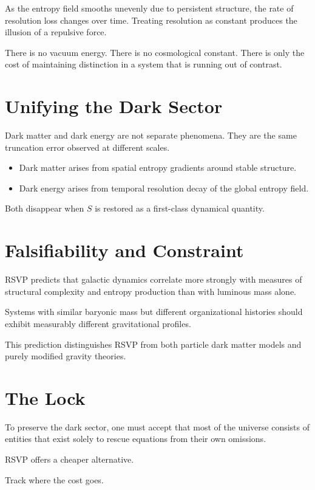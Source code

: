 \documentclass[11pt]{book}
\begin{document}
As the entropy field smooths unevenly due to persistent structure, the rate of resolution loss changes over time. Treating resolution as constant produces the illusion of a repulsive force.

There is no vacuum energy. There is no cosmological constant. There is only the cost of maintaining distinction in a system that is running out of contrast.

\section{Unifying the Dark Sector}

Dark matter and dark energy are not separate phenomena. They are the same truncation error observed at different scales.

\begin{itemize}
\item Dark matter arises from spatial entropy gradients around stable structure.
\item Dark energy arises from temporal resolution decay of the global entropy field.
\end{itemize}

Both disappear when \(S\) is restored as a first-class dynamical quantity.

\section{Falsifiability and Constraint}

RSVP predicts that galactic dynamics correlate more strongly with measures of structural complexity and entropy production than with luminous mass alone.

Systems with similar baryonic mass but different organizational histories should exhibit measurably different gravitational profiles.

This prediction distinguishes RSVP from both particle dark matter models and purely modified gravity theories.

\section{The Lock}

To preserve the dark sector, one must accept that most of the universe consists of entities that exist solely to rescue equations from their own omissions.

RSVP offers a cheaper alternative.

Track where the cost goes.
\end{document}
